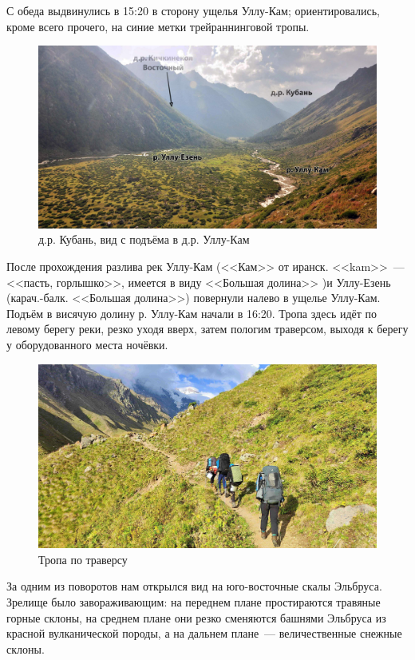 С обеда выдвинулись в 15:20 в сторону ущелья Уллу-Кам; ориентировались, кроме всего прочего, на синие метки трейраннинговой тропы.

\begin{figure}[h!]
	\centering
	\includegraphics[width=0.7\linewidth]{../pics/DSC_0464 2.JPG}
	\caption{д.р. Кубань, вид с подъёма в д.р. Уллу-Кам}
	\label{fig:DSC_0464 2.JPG}
\end{figure}

После прохождения разлива рек Уллу-Кам (<<Кам>> от иранск. <<kam>>~---<<пасть, горлышко>>, имеется в виду <<Большая долина>> \cite{proza})и Уллу-Езень (карач.-балк. <<Большая долина>>) повернули налево в ущелье Уллу-Кам. Подъём в висячую долину р. Уллу-Кам начали в 16:20. Тропа здесь идёт по левому берегу реки, резко уходя вверх, затем пологим траверсом, выходя к берегу у оборудованного места ночёвки.


\begin{figure}[h!]
	\centering
	\includegraphics[width=0.7\linewidth]{../pics/IMG_20240829_170756.jpg}
	\caption{Тропа по траверсу}
	\label{fig:IMG_20240829_170756.jpg}
\end{figure}

За одним из поворотов нам открылся вид на юго-восточные скалы Эльбруса. Зрелище было завораживающим: на переднем плане простираются травяные горные склоны, на среднем плане они резко сменяются башнями Эльбруса из красной вулканической породы, а на дальнем плане~--- величественные снежные склоны.

